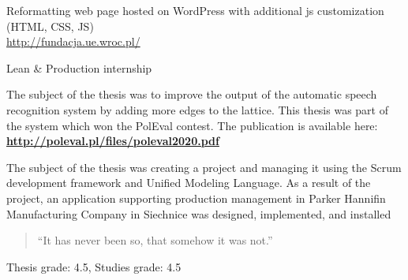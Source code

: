 \documentclass[10pt,a4paper,ragged2e,withhyper, normalphoto]{altacv}
\begin{document}
\begin{paracol}{2}
    \divider

    
    Reformatting web page hosted on WordPress with additional js customization (HTML, CSS, JS) \\ \url{http://fundacja.ue.wroc.pl/}
    
    \divider
    
    Lean \& Production internship 
    
    \divider



The subject of the thesis was to improve the output of the automatic speech recognition system by adding more edges to the lattice. This thesis was part of the system which won the PolEval contest. The publication is available here:
\\ \textcolor{PastelRed}{\textbf{\url{http://poleval.pl/files/poleval2020.pdf}}}

\medskip

The subject of the thesis was creating a project and managing it using the Scrum development framework and Unified Modeling Language.
As a result of the project, an application supporting production management in Parker Hannifin Manufacturing Company in Siechnice was designed, implemented, and installed
\medskip





\switchcolumn


\begin{quote}
``It has never been so, that somehow it was not.''
\end{quote}
\medskip

    Thesis grade: 4.5,
    Studies grade: 4.5 
    

\end{paracol}
\end{document}
